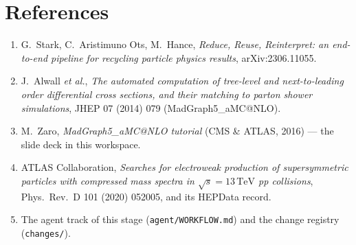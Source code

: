 \documentclass[11pt,oneside]{report}
\newcommand{\code}[1]{\texttt{#1}}
\newcommand{\rts}{\sqrt{s}}
\newcommand{\TeV}{\,\text{TeV}}
\begin{document}
\chapter{References}
\begin{enumerate}[nosep]
  \item G.~Stark, C.~Aristimuno Ots, M.~Hance, \emph{Reduce, Reuse, Reinterpret: an end-to-end
        pipeline for recycling particle physics results}, arXiv:2306.11055.
  \item J.~Alwall \emph{et al.}, \emph{The automated computation of tree-level and next-to-leading
        order differential cross sections, and their matching to parton shower simulations},
        JHEP 07 (2014) 079 (MadGraph5\_aMC@NLO).
  \item M.~Zaro, \emph{MadGraph5\_aMC@NLO tutorial} (CMS \& ATLAS, 2016) --- the slide deck in this
        workspace.
  \item ATLAS Collaboration, \emph{Searches for electroweak production of supersymmetric particles
        with compressed mass spectra in $\rts=13\TeV$ pp collisions}, Phys.\ Rev.\ D 101 (2020)
        052005, and its HEPData record.
  \item The agent track of this stage (\code{agent/WORKFLOW.md}) and the change registry
        (\code{changes/}).
\end{enumerate}
\end{document}
